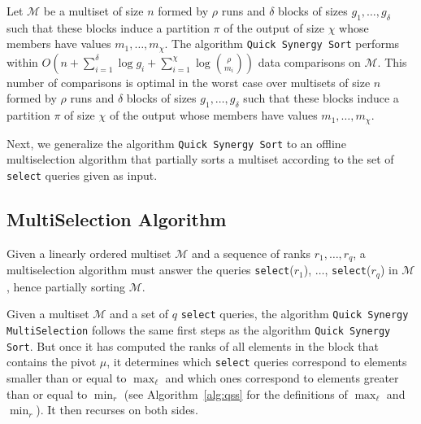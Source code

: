 \begin{INUTILE}
  \begin{theorem}
    Let $\mathcal{M}$ be a multiset of size $n$ formed by $\rho$ runs
    and $\delta$ blocks of sizes $g_1, \dots, g_{\delta}$ such that
    these blocks induce a partition $\pi$ of the output of size $\chi$
    whose members have values $m_1, \dots, m_{\chi}$. The algorithm
    \texttt{Quick Synergy Sort} performs within
    $O(n + \sum^{\delta}_{i=1} \log g_i +
    \sum^{\chi}_{i=1}\log{\binom{\rho}{m_i}})$ data comparisons on
    $\mathcal{M}$. This number of comparisons is optimal in the worst
    case over multisets of size $n$ formed by $\rho$ runs and $\delta$
    blocks of sizes $g_1, \dots, g_{\delta}$ such that these blocks
    induce a partition $\pi$ of size $\chi$ of the output whose
    members have values $m_1, \dots, m_{\chi}$.
  \end{theorem}
\end{INUTILE}

Next, we generalize the algorithm \texttt{Quick Synergy Sort} to an
offline multiselection algorithm that partially sorts a multiset according to the set
of \texttt{select} queries given as input.

\subsection{MultiSelection Algorithm}
\label{sec:multiselect}

Given a linearly ordered multiset $\mathcal{M}$ and a sequence of
ranks $r_1, \dots, r_q$, a multiselection algorithm must answer the
queries \texttt{select}($r_1$), $\dots$, \texttt{select}($r_q$) in
$\mathcal{M}$, hence partially sorting $\mathcal{M}$.

Given a multiset $\mathcal{M}$ and a set of $q$ \texttt{select}
queries, the algorithm \texttt{Quick Synergy MultiSelection}
follows the same first steps as the algorithm \texttt{Quick Synergy
  Sort}. But once it has computed the ranks of all elements in the block that
contains the pivot $\mu$, it determines which \texttt{select} queries
correspond to elements smaller than or equal to $\max_\ell$ and which
ones correspond to elements greater than or equal to $\min_r$ (see
Algorithm~\ref{alg:qss} for the definitions of $\max_\ell$ and
$\min_r$). It then recurses on both sides.


